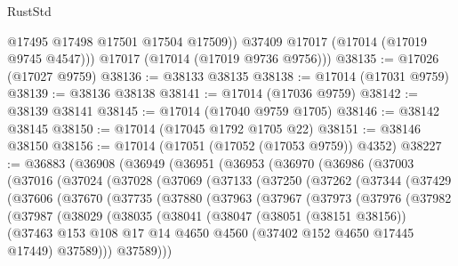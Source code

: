 \begin{lexlean}{RustStd}
\begin{coremodule}
            @17495
            @17498
            @17501
            @17504
            @17509))
        @37409
        @17017
        (@17014 (@17019 @9745 @4547)))
      @17017
      (@17014 (@17019 @9736 @9756)))
@38135 := @17026 (@17027 @9759)
@38136 := @38133 @38135
@38138 := @17014 (@17031 @9759)
@38139 := @38136 @38138
@38141 := @17014 (@17036 @9759)
@38142 := @38139 @38141
@38145 := @17014 (@17040 @9759 @1705)
@38146 := @38142 @38145
@38150 := @17014 (@17045 @1792 @1705 @22)
@38151 := @38146 @38150
@38156 := @17014 (@17051 (@17052 (@17053 @9759)) @4352)
@38227 := @36883
    (@36908
      (@36949
        (@36951
          (@36953
            (@36970
              (@36986
                (@37003
                  (@37016
                    (@37024
                      (@37028
                        (@37069
                          (@37133
                            (@37250
                              (@37262
                                (@37344
                                  (@37429
                                    (@37606
                                      (@37670
                                        (@37735
                                          (@37880
                                            (@37963
                                              (@37967
                                                (@37973
                                                  (@37976
                                                    (@37982
                                                      (@37987
                                                        (@38029
                                                          (@38035
                                                            (@38041
                                                              (@38047
                                                                (@38051 (@38151 @38156))
                                                                (@37463
                                                                  @153
                                                                  @108
                                                                  @17
                                                                  @14
                                                                  @4650
                                                                  @4560
                                                                  (@37402 @152 @4650 @17445 @17449)
                                                                  @37589)))
                                                            @37589)))

\end{coremodule}
\end{lexlean}
